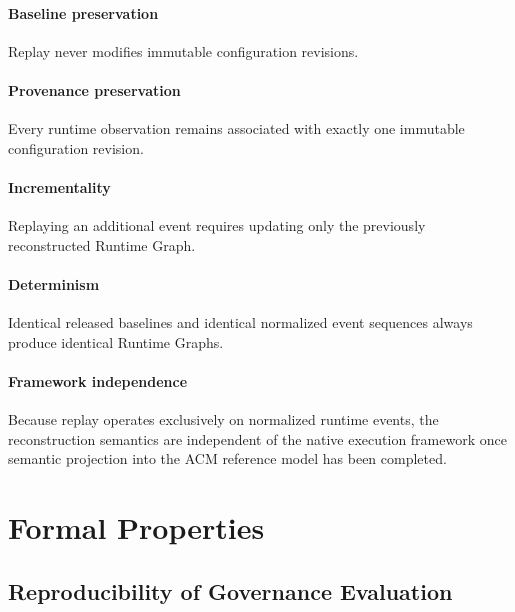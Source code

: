 \documentclass[10pt]{article}
\begin{document}
	\paragraph*{Baseline preservation}
	
	Replay never modifies immutable configuration revisions.
	
	\paragraph*{Provenance preservation}
	
	Every runtime observation remains associated with exactly one immutable
	configuration revision.
	
	\paragraph*{Incrementality}
	
	Replaying an additional event requires updating only the previously
	reconstructed Runtime Graph.
	
	\paragraph*{Determinism}
	
	Identical released baselines and identical normalized event sequences always
	produce identical Runtime Graphs.
	
	\paragraph*{Framework independence}
	
	Because replay operates exclusively on normalized runtime events, the
	reconstruction semantics are independent of the native execution framework once
	semantic projection into the ACM reference model has been completed.
	
	\section{Formal Properties}
	\label{appendix:formal_properties}
	
	\subsection{Reproducibility of Governance Evaluation}
	\label{appendix:governance_reproducibility}
	
\end{document}
